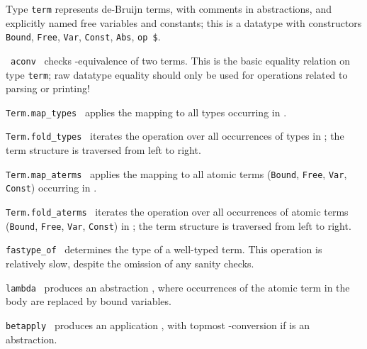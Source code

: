 \begin{isabellebody}
\begin{isamarkuptext}
  \begin{description}

  \item Type \verb|term| represents de-Bruijn terms, with comments
  in abstractions, and explicitly named free variables and constants;
  this is a datatype with constructors \verb|Bound|, \verb|Free|, \verb|Var|, \verb|Const|, \verb|Abs|, \verb|op $|.

  \item {}~\verb|aconv|~ checks -equivalence of two terms.  This is the basic equality relation
  on type \verb|term|; raw datatype equality should only be used
  for operations related to parsing or printing!

  \item \verb|Term.map_types|~ applies the mapping  to all types occurring in .

  \item \verb|Term.fold_types|~ iterates the operation
   over all occurrences of types in ; the term
  structure is traversed from left to right.

  \item \verb|Term.map_aterms|~ applies the mapping  to all atomic terms (\verb|Bound|, \verb|Free|, \verb|Var|, \verb|Const|) occurring in .

  \item \verb|Term.fold_aterms|~ iterates the operation
   over all occurrences of atomic terms (\verb|Bound|, \verb|Free|, \verb|Var|, \verb|Const|) in ; the term structure is
  traversed from left to right.

  \item \verb|fastype_of|~ determines the type of a
  well-typed term.  This operation is relatively slow, despite the
  omission of any sanity checks.

  \item \verb|lambda|~ produces an abstraction , where occurrences of the atomic term  in the
  body  are replaced by bound variables.

  \item \verb|betapply|~ produces an application , with topmost -conversion if  is an
  abstraction.


\end{description}
\end{isamarkuptext}
\end{isabellebody}
